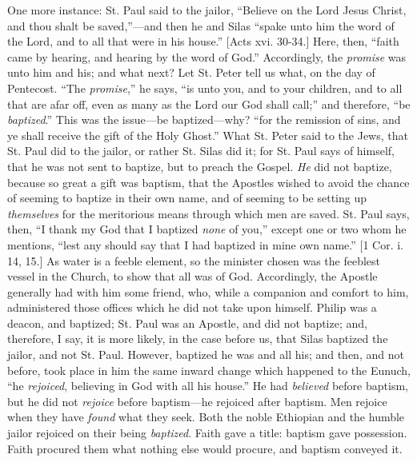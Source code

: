 One more instance: St. Paul said to the jailor, ``Believe on
the Lord Jesus Christ, and thou shalt be saved,''—and then he
and Silas ``spake unto him the word of the Lord, and to all that
were in his house.'' [Acts xvi. 30-34.] Here, then, ``faith
came by hearing, and hearing by the word of God.'' Accordingly,
the \emph{promise} was unto him and his; and what next? Let St. Peter
tell us what, on the day of Pentecost. ``The \emph{promise},''
he says, ``is unto you, and to your children, and to all that are
afar off, even as many as the Lord our God shall call;'' and
therefore, ``be \emph{baptized}.'' This was the issue—be
baptized—why? ``for the remission of sins, and ye shall receive
the gift of the Holy Ghost.'' What St. Peter said to the Jews,
that St. Paul did to the jailor, or rather St. Silas did it; for St.
Paul says of himself, that he was not sent to baptize, but to preach
the Gospel. \emph{He} did not baptize, because so great a gift was
baptism, that the Apostles wished to avoid the chance of seeming to
baptize in their own name, and of seeming to be setting up \emph{themselves}
for the meritorious means through which men are saved. St. Paul says,
then, ``I thank my God that I baptized \emph{none} of you,''
except one or two whom he mentions, ``lest any should say that I
had baptized in mine own name.'' [1 Cor. i. 14, 15.] As water is a
feeble element, so the minister chosen was the feeblest vessel in the
Church, to show that all was of God. Accordingly, the Apostle
generally had with him some friend, who, while a companion and comfort
to him, administered those offices which he did not take upon himself.
Philip was a deacon, and baptized; St. Paul was an Apostle, and did
not baptize; and, therefore, I say, it is more likely, in the case
before us, that Silas baptized the jailor, and not St. Paul. However,
baptized he was and all his; and then, and not before, took place in
him the same inward change which happened to the Eunuch, ``he \emph{rejoiced},
believing in God with all his house.'' He had \emph{believed}
before baptism, but he did not \emph{rejoice} before baptism—he
rejoiced after baptism. Men rejoice when they have \emph{found} what
they seek. Both the noble Ethiopian and the humble jailor rejoiced on
their being \emph{baptized}. Faith gave a title: baptism gave
possession. Faith procured them what nothing else would procure, and
baptism conveyed it.

